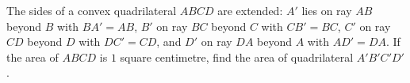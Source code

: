 The sides of a convex quadrilateral $ABCD$ are extended: $A'$ lies on ray $AB$ beyond $B$ with $BA'=AB$, $B'$ on ray $BC$ beyond $C$ with $CB'=BC$, $C'$ on ray $CD$ beyond $D$ with $DC'=CD$, and $D'$ on ray $DA$ beyond $A$ with $AD'=DA$. If the area of $ABCD$ is $1$ square centimetre, find the area of quadrilateral $A'B'C'D'$.
